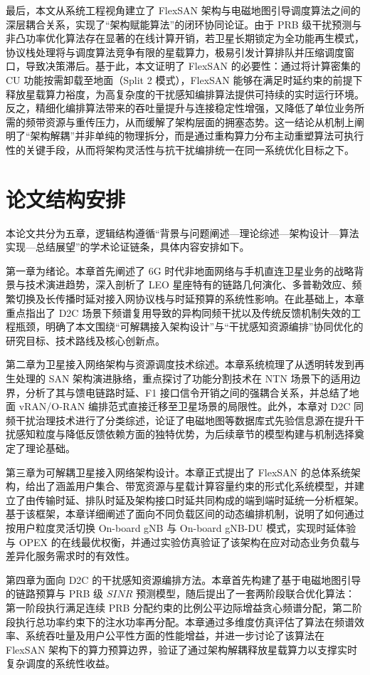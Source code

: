 \documentclass[type=master]{fduthesis}
\begin{document}
最后，本文从系统工程视角建立了 FlexSAN 架构与电磁地图引导调度算法之间的深层耦合关系，实现了“架构赋能算法”的闭环协同论证。由于 PRB 级干扰预测与非凸功率优化算法存在显著的在线计算开销，若卫星长期锁定为全功能再生模式，协议栈处理将与调度算法竞争有限的星载算力，极易引发计算排队并压缩调度窗口，导致决策滞后。基于此，本文证明了 FlexSAN 的必要性：通过将计算密集的 CU 功能按需卸载至地面（Split 2 模式），FlexSAN 能够在满足时延约束的前提下释放星载算力裕度，为高复杂度的干扰感知编排算法提供可持续的实时运行环境。反之，精细化编排算法带来的吞吐量提升与连接稳定性增强，又降低了单位业务所需的频带资源与重传压力，从而缓解了架构层面的拥塞态势。这一结论从机制上阐明了“架构解耦”并非单纯的物理拆分，而是通过重构算力分布主动重塑算法可执行性的关键手段，从而将架构灵活性与抗干扰编排统一在同一系统优化目标之下。

\section{论文结构安排}
本论文共分为五章，逻辑结构遵循“背景与问题阐述—理论综述—架构设计—算法实现—总结展望”的学术论证链条，具体内容安排如下。

第一章为绪论。本章首先阐述了 6G 时代非地面网络与手机直连卫星业务的战略背景与技术演进趋势，深入剖析了 LEO 星座特有的链路几何演化、多普勒效应、频繁切换及长传播时延对接入网协议栈与时延预算的系统性影响。在此基础上，本章重点指出了 D2C 场景下频谱复用导致的异构同频干扰以及传统反馈机制失效的工程瓶颈，明确了本文围绕“可解耦接入架构设计”与“干扰感知资源编排”协同优化的研究目标、技术路线及核心创新点。

第二章为卫星接入网络架构与资源调度技术综述。本章系统梳理了从透明转发到再生处理的 SAN 架构演进脉络，重点探讨了功能分割技术在 NTN 场景下的适用边界，分析了其与馈电链路时延、F1 接口信令开销之间的强耦合关系，并总结了地面 vRAN/O-RAN 编排范式直接迁移至卫星场景的局限性。此外，本章对 D2C 同频干扰治理技术进行了分类综述，论证了电磁地图等数据库式先验信息源在提升干扰感知粒度与降低反馈依赖方面的独特优势，为后续章节的模型构建与机制选择奠定了理论基础。

第三章为可解耦卫星接入网络架构设计。本章正式提出了 FlexSAN 的总体系统架构，给出了涵盖用户集合、带宽资源与星载计算容量约束的形式化系统模型，并建立了由传输时延、排队时延及架构接口时延共同构成的端到端时延统一分析框架。基于该框架，本章详细阐述了面向不同负载区间的动态编排机制，说明了如何通过按用户粒度灵活切换 On-board gNB 与 On-board gNB-DU 模式，实现时延体验与 OPEX 的在线最优权衡，并通过实验仿真验证了该架构在应对动态业务负载与差异化服务需求时的有效性。

第四章为面向 D2C 的干扰感知资源编排方法。本章首先构建了基于电磁地图引导的链路预算与 PRB 级 $SINR$ 预测模型，随后提出了一套两阶段联合优化算法：第一阶段执行满足连续 PRB 分配约束的比例公平边际增益贪心频谱分配，第二阶段执行总功率约束下的注水功率再分配。本章通过多维度仿真评估了算法在频谱效率、系统吞吐量及用户公平性方面的性能增益，并进一步讨论了该算法在 FlexSAN 架构下的算力预算边界，验证了通过架构解耦释放星载算力以支撑实时复杂调度的系统性收益。
\end{document}
